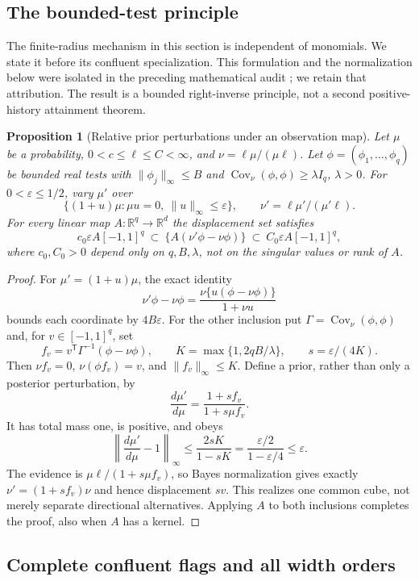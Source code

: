 \documentclass[11pt]{amsart}
\newtheorem{proposition}[theorem]{Proposition}
\theoremstyle{definition}\newtheorem{definition}[theorem]{Definition}
\theoremstyle{remark}\newtheorem{remark}[theorem]{Remark}
\newcommand{\R}{\mathbb R}\newcommand{\N}{\mathbb N}\newcommand{\C}{\mathbb C}
\begin{document}
\subsection{The bounded-test principle}
The finite-radius mechanism in this section is independent of monomials.
We state it before its confluent specialization. This formulation and the
normalization below were isolated in the preceding mathematical audit
\cite{A1v14audit}; we retain that attribution. The result is a bounded
right-inverse principle, not a second positive-history attainment theorem.

\begin{proposition}[Relative prior perturbations under an observation map]
\label{prop:general-bounded-dual}
Let $\mu$ be a probability, $0<c\le\ell\le C<\infty$, and
$\nu=\ell\mu/(\mu\ell)$. Let $\phi=(\phi_1,\ldots,\phi_q)$ be
bounded real tests with $\|\phi_j\|_\infty\le B$ and
$\operatorname{Cov}_\nu(\phi,\phi)\ge\lambda I_q$, $\lambda>0$.
For $0<\varepsilon\le1/2$, vary $\mu'$ over
\[
 \{(1+u)\mu:\mu u=0,\ \|u\|_\infty\le\varepsilon\},
 \qquad \nu'=\ell\mu'/(\mu'\ell).
\]
For every linear map $A:\R^q\to\R^d$ the displacement set satisfies
\[
 c_0\varepsilon A[-1,1]^q
 \ \subset\ \{A(\nu'\phi-\nu\phi)\}
 \ \subset\ C_0\varepsilon A[-1,1]^q,
\]
where $c_0,C_0>0$ depend only on $q,B,\lambda$, not on the singular
values or rank of $A$.
\end{proposition}
\begin{proof}
For $\mu'=(1+u)\mu$, the exact identity
\[
 \nu'\phi-\nu\phi
 =\frac{\nu\{u(\phi-\nu\phi)\}}{1+\nu u}
\]
bounds each coordinate by $4B\varepsilon$. For the other inclusion put
$\Gamma=\operatorname{Cov}_\nu(\phi,\phi)$ and, for
$v\in[-1,1]^q$, set
\[
 f_v=v^{\mathsf T}\Gamma^{-1}(\phi-\nu\phi),\qquad
 K=\max\{1,2qB/\lambda\},\qquad s=\varepsilon/(4K).
\]
Then $\nu f_v=0$, $\nu(\phi f_v)=v$, and $\|f_v\|_\infty\le K$.
Define a prior, rather than only a posterior perturbation, by
\[
 \frac{d\mu'}{d\mu}=\frac{1+s f_v}{1+s\mu f_v}.
\]
It has total mass one, is positive, and obeys
\[
 \left\|\frac{d\mu'}{d\mu}-1\right\|_\infty
 \le\frac{2sK}{1-sK}
 =\frac{\varepsilon/2}{1-\varepsilon/4}\le\varepsilon.
\]
The evidence is $\mu\ell/(1+s\mu f_v)$, so Bayes normalization gives
exactly $\nu'=(1+s f_v)\nu$ and hence displacement $sv$. This realizes
one common cube, not merely separate directional alternatives. Applying
$A$ to both inclusions completes the proof, also when $A$ has a kernel.
\end{proof}

\subsection{Complete confluent flags and all width orders}
\end{document}
